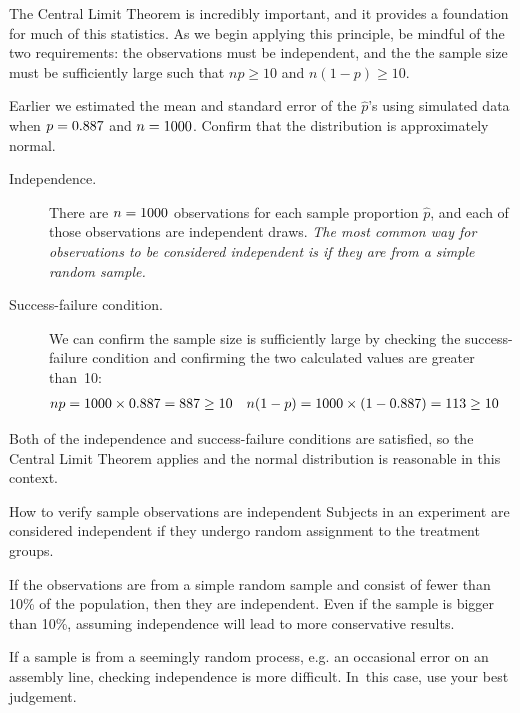 The Central Limit Theorem is incredibly important, and it provides
a foundation for much of this statistics. As we begin applying
this principle, be mindful of the two requirements:
the observations must be independent, and the the sample size must
be sufficiently large such that $np \geq 10$ and $n(1-p) \geq 10$.

\begin{examplewrap}
\begin{nexample}{Earlier we estimated the mean and standard
error of the $\hat{p}$'s using simulated data when
$p = 0.887{}$ and $n = 1000{}$.
Confirm that the distribution is approximately
normal.}\label{sample_p887_n1000_confirm_normal}
\begin{description}
\item[Independence.] There are $n = 1000{}$
    observations for each
    sample proportion $\hat{p}$, and each of those observations
    are independent draws. \emph{The most common way for
    observations to be considered independent is if they are from
    a simple random sample.}
\item[Success-failure condition.] We can confirm the sample size
    is sufficiently large by checking the success-failure condition
    and confirming the two calculated values are greater than~10:
    \begin{align*}
    np &= 1000{} \times 0.887{}
        = 887{}
        \geq 10
    &n(1-p) &= 1000{} \times (1 - 0.887{})
        = 113{}
        \geq 10
    \end{align*}
\end{description}
Both of the independence and success-failure conditions are
satisfied, so the Central Limit Theorem applies and the normal
distribution is reasonable in this context.
\end{nexample}
\end{examplewrap}

\begin{onebox}{How to verify sample observations are independent}
  Subjects in an experiment are considered independent
  if they undergo random assignment to the treatment
  groups.\vspace{3mm}

  If the observations are from a simple random sample and
  consist of fewer than 10\% of the population, then they
  are independent.
  Even if the sample is bigger than 10\%, assuming independence
  will lead to more conservative results.\vspace{3mm}

  If a sample is from a seemingly random process,
  e.g. an occasional error on an assembly line,
  checking independence is more difficult. In~this case,
  use your best judgement.
\end{onebox}

